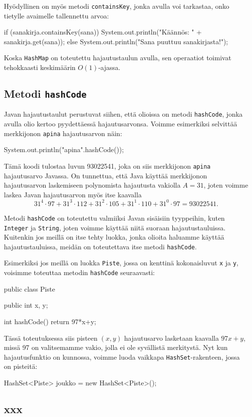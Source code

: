 Hyödyllinen on myös metodi \texttt{containsKey},
jonka avulla voi tarkastaa, onko tietylle avaimelle
tallennettu arvoa:

\begin{code}
if (sanakirja.containsKey(sana)) {
    System.out.println("Käännös: " + sanakirja.get(sana));
} else {
    System.out.println("Sana puuttuu sanakirjasta!");
}
\end{code}

Koska \texttt{HashMap} on toteutettu hajautustaulun avulla,
sen operaatiot toimivat tehokkaasti keskimäärin $O(1)$-ajassa.

\subsection{Metodi \texttt{hashCode}}

Javan hajautustaulut perustuvat siihen, että olioissa
on metodi \texttt{hashCode}, jonka avulla olio kertoo
pyydettäessä hajautusarvonsa.
Voimme esimerkiksi selvittää merkkijonon \texttt{apina}
hajautusarvon näin:

\begin{code}
System.out.println("apina".hashCode());
\end{code}

Tämä koodi tulostaa luvun 93022541,
joka on siis merkkijonon \texttt{apina} hajautusarvo Javassa.
On tunnettua, että Java käyttää merkkijonon hajautusarvon laskemiseen
polynomista hajautusta vakiolla $A=31$,
joten voimme laskea Javan hajautusarvon myös itse kaavalla
\[31^4 \cdot 97+31^3 \cdot 112+31^2 \cdot 105+31^1 \cdot 110+31^0 \cdot 97=93022541.\]

Metodi \texttt{hashCode} on toteutettu valmiiksi Javan
sisäisiin tyyppeihin, kuten \texttt{Integer} ja \texttt{String},
joten voimme käyttää niitä suoraan hajautustauluissa.
Kuitenkin jos meillä on itse tehty luokka, jonka olioita
haluamme käyttää hajautustauluissa, meidän on toteutettava
itse metodi \texttt{hashCode}.

Esimerkiksi jos meillä on luokka \texttt{Piste},
jossa on kenttinä kokonaisluvut \texttt{x} ja \texttt{y},
voisimme toteuttaa metodin \texttt{hashCode} seuraavasti:

\begin{code}
public class Piste {
    public int x, y;

    int hashCode() {
        return 97*x+y;
    }
}
\end{code}

Tässä toteutuksessa siis pisteen $(x,y)$ hajautusarvo lasketaan
kaavalla $97x+y$, missä 97 on valitsemamme vakio, jolla ei ole
syvällistä merkitystä.
Nyt kun hajautusfunktio on kunnossa,
voimme luoda vaikkapa \texttt{HashSet}-rakenteen, jossa on pisteitä:

\begin{code}
HashSet<Piste> joukko = new HashSet<Piste>();
\end{code}

\subsection{xxx}